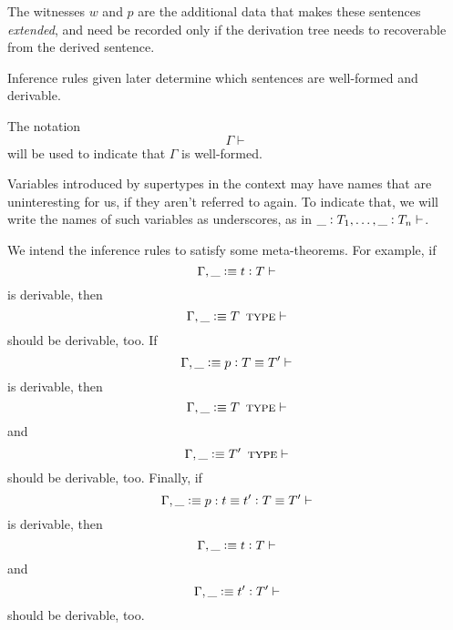 \documentclass[11pt]{article}
\newcommand{\eqd}{\equiv}
\newcommand{\ccolon}{\vcentcolon}
\newcommand{\ccheck}{\vcentcolon}            %
\newcommand{\csynth}{\vcentcolon\vcentcolon} %
\renewcommand{\csynth}{\ccheck}              %
\newcommand{\Type}{\mathop{\text{ \sc type}}}
\newcommand{\Okay}{\mathop{\text{ \sc okay}}}
\newcommand{\Context}{\vdash\Okay}
\renewcommand{\Context}{\vdash}
\newcommand{\var}{\char`_}
\newcommand{\defn}{\vcentcolon\equiv}
\begin{document}
The witnesses $w$ and $p$ are the additional data that makes these sentences
{\em extended}, and need be recorded only if the derivation tree needs to
recoverable from the derived sentence.

Inference rules given later determine which sentences are well-formed and
derivable.

The notation $$\Gamma \Context$$ will be used to indicate that $\Gamma$ is
well-formed.

Variables introduced by supertypes in the context may have names that are
uninteresting for us, if they aren't referred to again.  To indicate that, we
will write the names of such variables as underscores, as in $\var
\ccolon T_1,\dots,\var \ccolon T_n\Context$.






We intend the inference rules to satisfy some meta-theorems.  For example, if 
$$ \Gamma, \var \defn t \ccolon T \Context $$
is derivable, then
$$ \Gamma, \var \defn T \Type \Context $$
should be derivable, too.  If
$$ \Gamma, \var \defn p \ccolon T \eqd T' \Context $$
is derivable, then
$$ \Gamma, \var \defn T \Type \Context $$
and
$$ \Gamma, \var \defn T' \Type \Context $$
should be derivable, too.  Finally, if 
$$ \Gamma, \var \defn p : t \eqd t' \ccolon T \eqd T' \Context $$
is derivable, then
$$ \Gamma, \var \defn t \ccolon T \Context $$
and
$$ \Gamma, \var \defn t' \ccolon T' \Context $$
should be derivable, too.
\end{document}
